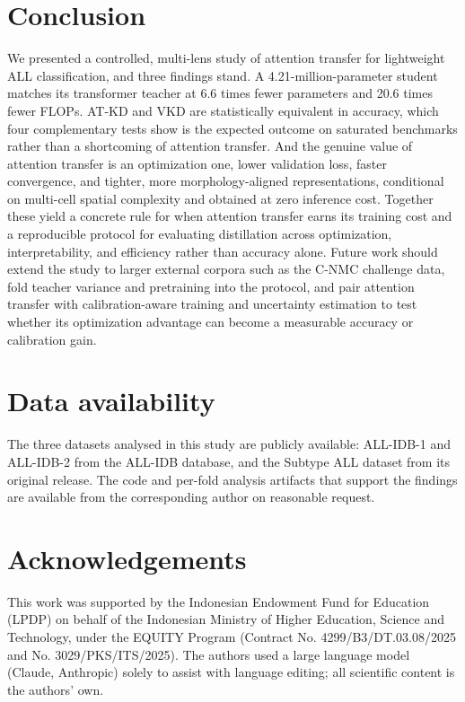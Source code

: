 \documentclass[preprint,review,12pt]{elsarticle}
\begin{document}
\section{Conclusion}
We presented a controlled, multi-lens study of attention transfer for
lightweight ALL classification, and three findings stand. A
4.21-million-parameter student matches its transformer teacher at 6.6
times fewer parameters and 20.6 times fewer FLOPs. AT-KD and VKD are
statistically equivalent in accuracy, which four complementary tests show
is the expected outcome on saturated benchmarks rather than a shortcoming
of attention transfer. And the genuine value of attention transfer is an
optimization one, lower validation loss, faster convergence, and tighter,
more morphology-aligned representations, conditional on multi-cell
spatial complexity and obtained at zero inference cost. Together these
yield a concrete rule for when attention transfer earns its training cost
and a reproducible protocol for evaluating distillation across
optimization, interpretability, and efficiency rather than accuracy
alone. Future work should extend the study to larger external corpora
such as the C-NMC challenge data, fold teacher variance and pretraining
into the protocol, and pair attention transfer with calibration-aware
training and uncertainty estimation \cite{ref49} to test whether its
optimization advantage can become a measurable accuracy or calibration
gain.

\section*{Data availability}
The three datasets analysed in this study are publicly available:
ALL-IDB-1 and ALL-IDB-2 from the ALL-IDB database, and the Subtype ALL
dataset from its original release. The code and per-fold analysis
artifacts that support the findings are available from the corresponding
author on reasonable request.

\section*{Acknowledgements}
This work was supported by the Indonesian Endowment Fund for Education
(LPDP) on behalf of the Indonesian Ministry of Higher Education, Science
and Technology, under the EQUITY Program (Contract No.
4299/B3/DT.03.08/2025 and No. 3029/PKS/ITS/2025). The authors used a
large language model (Claude, Anthropic) solely to assist with language
editing; all scientific content is the authors' own.
\end{document}

